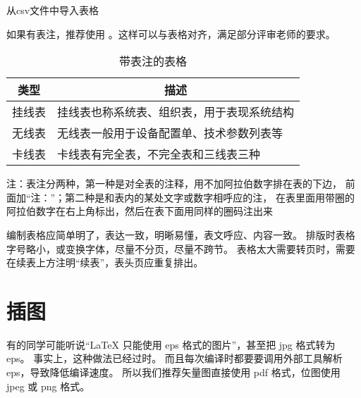 \begin{table}
	\centering
	\caption{从csv文件中导入表格}
	\begin{adjustbox}{max width=\linewidth}
	\end{adjustbox}
	\label{tab:asterid}
\end{table}

如果有表注，推荐使用 。这样可以与表格对齐，满足部分评审老师的要求。

\begin{table}
  \centering
  \begin{threeparttable}
    \caption{带表注的表格}
    \label{tab:tablewithnotes}
    \begin{tabular}{cl}
      \toprule
      类型   & \multicolumn{1}{c}{描述}              \\
      \midrule
      挂线表 & 挂线表也称系统表、组织表，用于表现系统结构 \\
      无线表 & 无线表一般用于设备配置单、技术参数列表等   \\
      卡线表 & 卡线表有完全表，不完全表和三线表三种       \\
      \bottomrule
    \end{tabular}
    \begin{tablenotes}[flushleft]
      \item 注：表注分两种，第一种是对全表的注释，用不加阿拉伯数字排在表的下边，
      前面加“注：”；第二种是和表内的某处文字或数字相呼应的注，
      在表里面用带圈的阿拉伯数字在右上角标出，然后在表下面用同样的圈码注出来
    \end{tablenotes}
  \end{threeparttable}
\end{table}

编制表格应简单明了，表达一致，明晰易懂，表文呼应、内容一致。
排版时表格字号略小，或变换字体，尽量不分页，尽量不跨节。
表格太大需要转页时，需要在续表上方注明“续表”，表头页应重复排出。



\section{插图}

有的同学可能听说“\LaTeX{} 只能使用 eps 格式的图片”，甚至把 jpg 格式转为 eps。
事实上，这种做法已经过时。
而且每次编译时都要要调用外部工具解析 eps，导致降低编译速度。
所以我们推荐矢量图直接使用 pdf 格式，位图使用 jpeg 或 png 格式。

